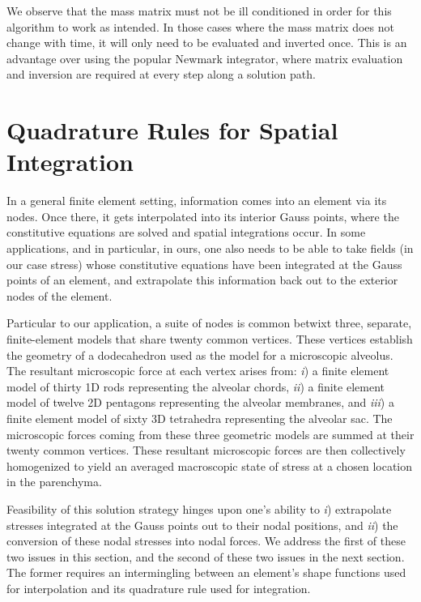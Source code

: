 We observe that the mass matrix must not be ill conditioned in order for this algorithm to work as intended.  In those cases where the mass matrix does not change with time, it will only need to be evaluated and inverted once.  This is an advantage over using the popular Newmark \cite{Newmark59} integrator, where matrix evaluation and inversion are required at every step along a solution path.


\section{Quadrature Rules for Spatial Integration}
\label{sec:Gauss}

In a general finite element setting, information comes into an element via its nodes.  Once there, it gets interpolated into its interior Gauss points, where the constitutive equations are solved and spatial integrations occur.  In some applications, and in particular, in ours, one also needs to be able to take fields (in our case stress) whose constitutive equations have been integrated at the Gauss points of an element, and extrapolate this information back out to the exterior nodes of the element.

Particular to our application, a suite of nodes is common betwixt three, separate, finite-element models that share twenty common vertices.  These vertices establish the geometry of a dodecahedron used as the model for a micro\-scopic alveolus.  The resultant micro\-scopic force at each vertex arises from: \textit{i\/}) a finite element model of thirty 1D rods representing the alveolar chords, \textit{ii\/}) a finite element model of twelve 2D pentagons representing the alveolar membranes, and \textit{iii\/}) a finite element model of sixty 3D tetrahedra representing the alveolar sac.  The micro\-scopic forces coming from these three geometric models are summed at their twenty common vertices. These resultant micro\-scopic forces are then collectively homo\-genized to yield an averaged macro\-scopic state of stress at a chosen location in the parenchyma.  

Feasibility of this solution strategy hinges upon one's ability to \textit{i\/}) extrapolate stresses integrated at the Gauss points out to their nodal positions, and \textit{ii\/}) the conversion of these nodal stresses into nodal forces.   We address the first of these two issues in this section, and the second of these two issues in the next section.  The former requires an intermingling between an element's shape functions used for interpolation and its quadrature rule used for integration.

